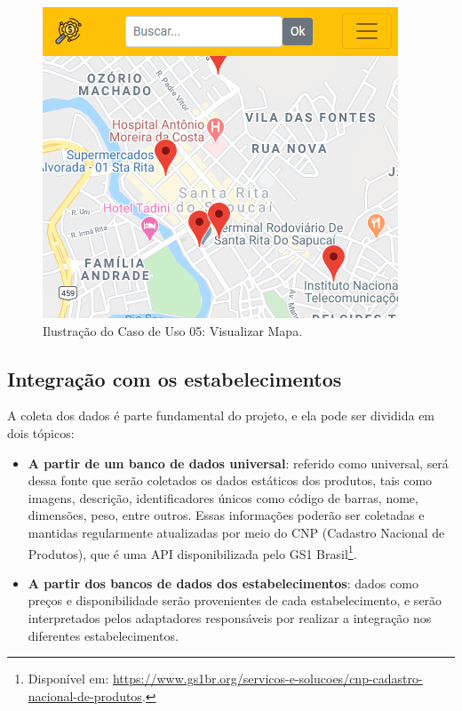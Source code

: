 \begin{figure}[H]
\centering
\includegraphics[width=\linewidth]{figuras/tela_mapa.png}
\caption{Ilustração do Caso de Uso 05: Visualizar Mapa.}
\label{fig:mapa}
\end{figure}

\subsection{Integração com os estabelecimentos}

A coleta dos dados é parte fundamental do projeto, e ela pode ser dividida em dois tópicos:
\begin{itemize}
    \item \textbf{A partir de um banco de dados universal}: referido como universal, será dessa fonte que serão coletados os dados estáticos dos produtos, tais como imagens, descrição, identificadores únicos como código de barras, nome, dimensões, peso, entre outros. Essas informações poderão ser coletadas e mantidas regularmente atualizadas por meio do CNP (Cadastro Nacional de Produtos), que é uma API disponibilizada pelo GS1 Brasil\footnote{Disponível em: \url{https://www.gs1br.org/servicos-e-solucoes/cnp-cadastro-nacional-de-produtos}.}.
    \item \textbf{A partir dos bancos de dados dos estabelecimentos}: dados como preços e disponibilidade serão provenientes de cada estabelecimento, e serão interpretados pelos adaptadores responsáveis por realizar a integração nos diferentes estabelecimentos.
\end{itemize}

